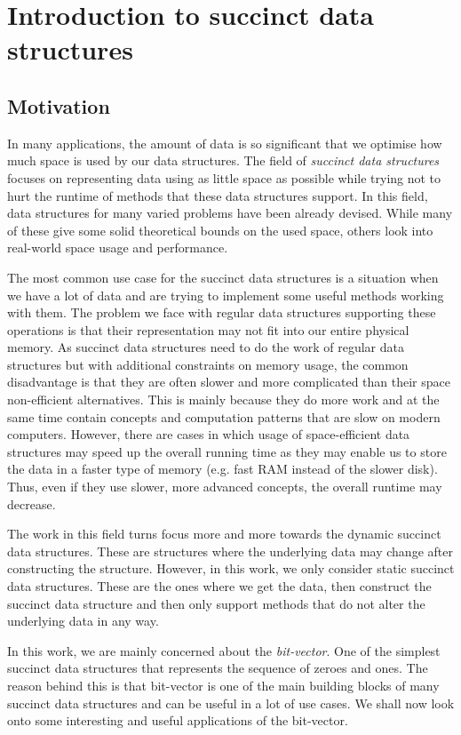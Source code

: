 \chapter{Introduction to succinct data structures}
\label{kap:kap1}

\section{Motivation}

In many applications, the amount of data is so significant that we optimise how much
space is used by our data structures. The field of \textit{succinct data structures}
focuses on representing data using as little space as possible while trying not to hurt
the runtime of methods that these data structures support. In this field, data structures
for many varied problems have been already devised. While many of these give some solid
theoretical bounds on the used space, others look into real-world space usage and
performance.

The most common use case for the succinct data structures is a situation when we
have a lot of data and are trying to implement some useful methods working
with them. The problem we face with regular data structures supporting these
operations is that their representation may not fit into our entire physical
memory. As succinct data structures need to do the work of regular data structures but
with additional constraints on memory usage, the common disadvantage is that
they are often slower and more complicated than their space non-efficient
alternatives. This is mainly because they do more work and at the same time contain
concepts and computation patterns that are slow on modern computers. However, there
are cases in which usage of space-efficient data structures may speed up the overall
running time as they may enable us to store the data in a faster type of memory
(e.g. fast RAM instead of the slower disk). Thus, even if they use slower, more
advanced concepts, the overall runtime may decrease.

The work in this field turns focus more and more towards the dynamic succinct
data structures. These are structures where the underlying data may change after
constructing the structure. However, in this work, we only consider static
succinct data structures. These are the ones where we get the data, then construct
the succinct data structure and then only support methods that do not alter the
underlying data in any way.

In this work, we are mainly concerned about the \textit{bit-vector}. One of the simplest
succinct data structures that represents the sequence of zeroes and ones. The reason
behind this is that bit-vector is one of the main building blocks of many succinct data
structures and can be useful in a lot of use cases. We shall now look onto some interesting
and useful applications of the bit-vector. 

